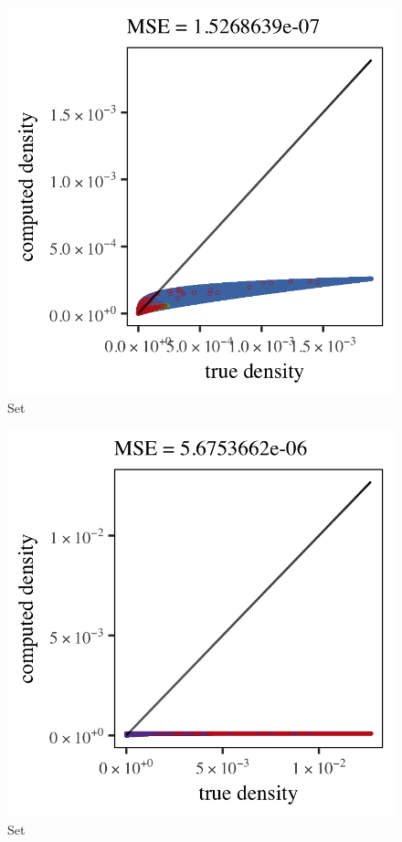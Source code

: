 \begin{subfigure}{0.3\textwidth}
	\centering
	\includegraphics[keepaspectratio=true, width=\textwidth, height=0.23\textheight]{4/img/results_baakman_2_600000_parzen}
	\caption{Set \baakmanTwo}
	\label{fig:4:simulated:datasets:parzen:baakman2}
\end{subfigure}	
\begin{subfigure}{0.3\textwidth}
	\centering
	\includegraphics[keepaspectratio=true, width=\textwidth, height=0.23\textheight]{4/img/results_baakman_3_1200000_parzen}
	\caption{Set \baakmanThree}
	\label{fig:4:simulated:datasets:parzen:baakman3}
\end{subfigure}				
